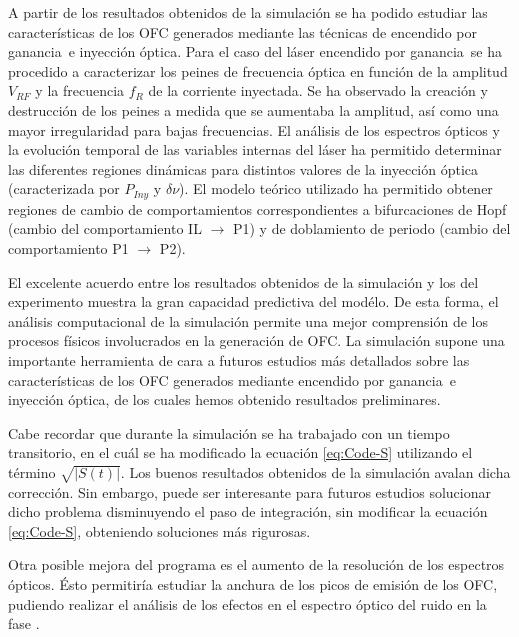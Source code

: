 \documentclass[a4paper, 11pt, oneside]{book}
\newcommand{\gs}{encendido por ganancia}
\begin{document}
				A partir de los resultados obtenidos de la simulaci\'on se ha podido estudiar las caracter\'isticas de los OFC generados mediante las t\'ecnicas de \gs\ e inyecci\'on \'optica. Para el caso del l\'aser \gs\ se ha procedido a caracterizar los peines de frecuencia \'optica en funci\'on de la amplitud $V_{RF}$ y la frecuencia $f_R$ de la corriente inyectada. Se ha observado la creaci\'on y destrucci\'on de los peines a medida que se aumentaba la amplitud, as\'i como una mayor irregularidad para bajas frecuencias. El an\'alisis de los espectros \'opticos y la evoluci\'on temporal de las variables internas del l\'aser ha permitido determinar las diferentes regiones din\'amicas para distintos valores de la inyecci\'on \'optica (caracterizada por $P_{Iny}$ y $\delta\nu$). El modelo te\'orico utilizado ha permitido obtener regiones de cambio de comportamientos correspondientes a bifurcaciones de Hopf (cambio del comportamiento IL $\rightarrow$ P1) y de doblamiento de periodo (cambio del comportamiento P1 $\rightarrow$ P2).

				El excelente acuerdo entre los resultados obtenidos de la simulaci\'on y los del experimento \cite{artSim, Chaves19} muestra la gran capacidad predictiva del mod\'elo. De esta forma, el an\'alisis computacional de la simulación permite una mejor comprensi\'on de los procesos f\'isicos involucrados en la generaci\'on de OFC. La simulaci\'on supone una importante herramienta de cara a futuros estudios m\'as detallados sobre las caracter\'isticas de los OFC generados mediante \gs\ e inyecci\'on \'optica, de los cuales hemos obtenido resultados preliminares.

				Cabe recordar que durante la simulación se ha trabajado con un tiempo transitorio, en el cu\'al se ha modificado la ecuaci\'on \ref{eq:Code-S} utilizando el t\'ermino $\sqrt{|S(t)|}$. Los buenos resultados obtenidos de la simulación avalan dicha correcci\'on. Sin embargo, puede ser interesante para futuros estudios solucionar dicho problema disminuyendo el paso de integraci\'on, sin modificar la ecuaci\'on \ref{eq:Code-S}, obteniendo soluciones m\'as rigurosas.

				Otra posible mejora del programa es el aumento de la resoluci\'on de los espectros \'opticos. \'Esto permitir\'ia estudiar la anchura de los picos de emisi\'on de los OFC, pudiendo realizar el an\'alisis de los efectos en el espectro \'optico del ruido en la fase .

\end{document}
